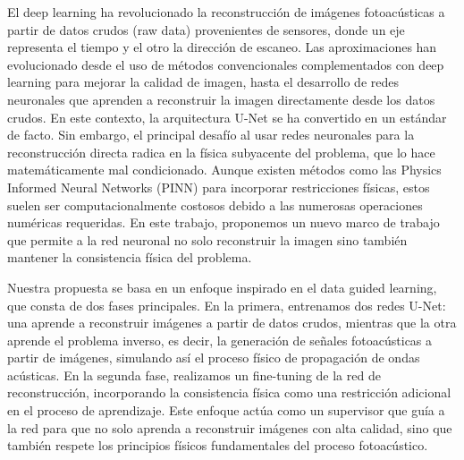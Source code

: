 El deep learning ha revolucionado la reconstrucción de imágenes fotoacústicas a partir de datos crudos (raw data) provenientes de sensores, donde un eje representa el tiempo y el otro la dirección de escaneo. Las aproximaciones han evolucionado desde el uso de métodos convencionales complementados con deep learning para mejorar la calidad de imagen, hasta el desarrollo de redes neuronales que aprenden a reconstruir la imagen directamente desde los datos crudos. En este contexto, la arquitectura U-Net se ha convertido en un estándar de facto.
Sin embargo, el principal desafío al usar redes neuronales para la reconstrucción directa radica en la física subyacente del problema, que lo hace matemáticamente mal condicionado. Aunque existen métodos como las Physics Informed Neural Networks (PINN) para incorporar restricciones físicas, estos suelen ser computacionalmente costosos debido a las numerosas operaciones numéricas requeridas. En este trabajo, proponemos un nuevo marco de trabajo que permite a la red neuronal no solo reconstruir la imagen sino también mantener la consistencia física del problema.

Nuestra propuesta se basa en un enfoque inspirado en el data guided learning, que consta de dos fases principales. En la primera, entrenamos dos redes U-Net: una aprende a reconstruir imágenes a partir de datos crudos, mientras que la otra aprende el problema inverso, es decir, la generación de señales fotoacústicas a partir de imágenes, simulando así el proceso físico de propagación de ondas acústicas. En la segunda fase, realizamos un fine-tuning de la red de reconstrucción, incorporando la consistencia física como una restricción adicional en el proceso de aprendizaje. Este enfoque actúa como un supervisor que guía a la red para que no solo aprenda a reconstruir imágenes con alta calidad, sino que también respete los principios físicos fundamentales del proceso fotoacústico.